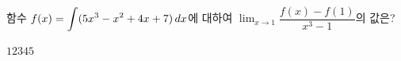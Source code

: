 함수 $f(x)=\displaystyle\int (5x^3-x^2+4x+7)\mkern3mu dx$에 대하여 $\displaystyle\lim_{x\to 1}\dfrac{f(x)-f(1)}{x^3-1}$의 값은?
\begin{choices32}{$1$}{$2$}{$3$}{$4$}{$5$}\end{choices32}
